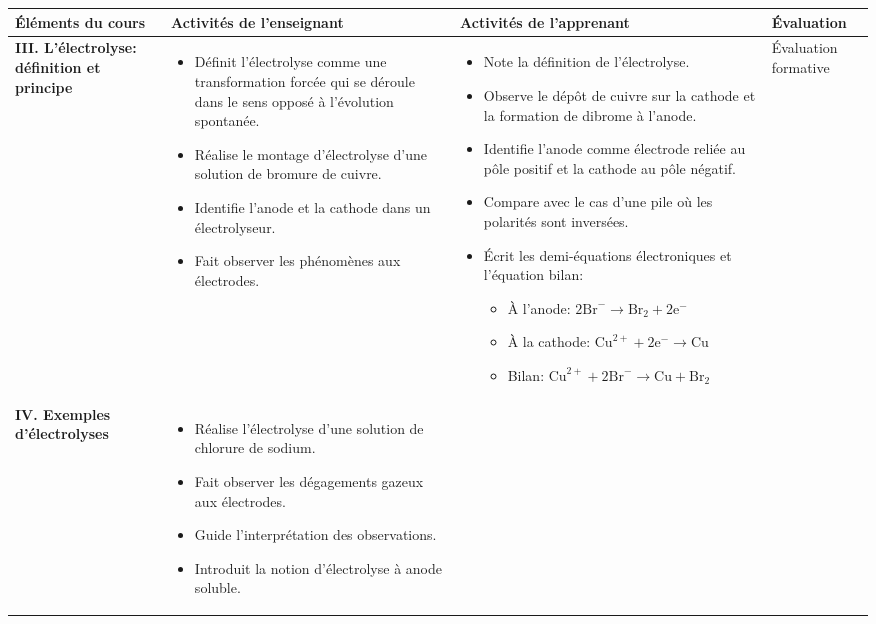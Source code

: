 \documentclass[12pt]{article}
\begin{document}
\begin{tabularx}{\textwidth}{|p{3.5cm}|X|X|p{2.5cm}|}
\hline
\rowcolor{lightgray}
\textbf{Éléments du cours} & \textbf{Activités de l'enseignant} & \textbf{Activités de l'apprenant} & \textbf{Évaluation} \\
\hline\hline
\textbf{III. L'électrolyse: définition et principe} & 
\begin{itemize}[leftmargin=*]
     \item Définit l'électrolyse comme une transformation forcée qui se déroule dans le sens opposé à l'évolution spontanée.
    \item Réalise le montage d'électrolyse d'une solution de bromure de cuivre.
    \item Identifie l'anode et la cathode dans un électrolyseur.
    \item Fait observer les phénomènes aux électrodes.
\end{itemize} & 
\begin{itemize}[leftmargin=*]
     \item Note la définition de l'électrolyse.
    \item Observe le dépôt de cuivre sur la cathode et la formation de dibrome à l'anode.
    \item Identifie l'anode comme électrode reliée au pôle positif et la cathode au pôle négatif.
    \item Compare avec le cas d'une pile où les polarités sont inversées.
    \item Écrit les demi-équations électroniques et l'équation bilan:
    \begin{itemize}
        \item À l'anode: $2\text{Br}^- \rightarrow \text{Br}_2 + 2\text{e}^-$
        \item À la cathode: $\text{Cu}^{2+} + 2\text{e}^- \rightarrow \text{Cu}$
        \item Bilan: $\text{Cu}^{2+} + 2\text{Br}^- \rightarrow \text{Cu} + \text{Br}_2$
    \end{itemize}
\end{itemize} & 
Évaluation formative \\
\hline

\textbf{IV. Exemples d'électrolyses}
 & 
\begin{itemize}[leftmargin=*]
    \item Réalise l'électrolyse d'une solution de chlorure de sodium.
    \item Fait observer les dégagements gazeux aux électrodes.
    \item Guide l'interprétation des observations.
    \item Introduit la notion d'électrolyse à anode soluble.


\end{itemize}
\end{tabularx}
\end{document}
